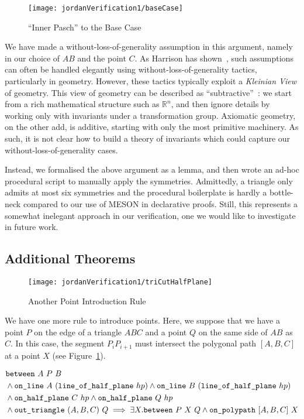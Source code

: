 \begin{figure}
\centering\texttt{[image: jordanVerification1/baseCase]}
\caption{``Inner Pasch'' to the Base Case}
\end{figure}

We have made a without-loss-of-generality assumption in this argument, namely in our choice of $AB$ and the point $C$. As Harrison has shown~\cite{HarrisonWLOG}, such assumptions can often be handled elegantly using without-loss-of-generality tactics, particularly in geometry. However, these tactics typically exploit a \emph{Kleinian View} of geometry. This view of geometry can be described as ``subtractive''~\cite{SubtractiveKlein}: we start from a rich mathematical structure such as $\mathbb{R}^n$, and then ignore details by working only with invariants under a transformation group. Axiomatic geometry, on the other add, is additive, starting with only the most primitive machinery. As such, it is not clear how to build a theory of invariants which could capture our without-loss-of-generality cases.

Instead, we formalised the above argument as a lemma, and then wrote an ad-hoc procedural script to manually apply the symmetries. Admittedly, a triangle only admits at most six symmetries and the procedural boilerplate is hardly a bottle-neck compared to our use of MESON in declarative proofs. Still, this represents a somewhat inelegant approach in our verification, one we would like to investigate in future work.

\subsection{Additional Theorems}\label{sec:AdditionalTheorems}
\begin{figure}
\centering
\texttt{[image: jordanVerification1/triCutHalfPlane]}
\caption{Another Point Introduction Rule}
\label{fig:triCutHalfPlane}
\end{figure}

We have one more rule to introduce points. Here, we suppose that we have a point $P$ on the edge of a triangle $ABC$ and a point $Q$ on the same side of $AB$ as $C$. In this case, the segment $P_iP_{i+1}$ must intersect the polygonal path $[A,B,C]$ at a point $X$ (see Figure~\ref{fig:triCutHalfPlane}). 

\begin{equation}\label{eq:triCutHalfPlane}
\begin{split}
&\between{A}{P}{B}\\
&\wedge \code{on\_line}\ A\ (\code{line\_of\_half\_plane}\ hp) \wedge \code{on\_line}\ B\ (\code{line\_of\_half\_plane}\ hp)\\
&\wedge \code{on\_half\_plane}\ C\ hp \wedge \code{on\_half\_plane}\ Q\ hp\\
&\wedge \code{out\_triangle}\ (A,B,C)\ Q\implies \exists X. \between{P}{X}{Q} \wedge \code{on\_polypath}\ [A,B,C]\ X
\end{split}
\end{equation}

